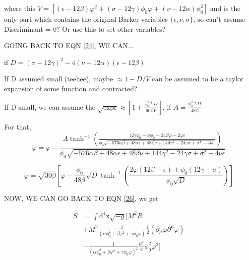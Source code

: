 \documentclass{article}
\begin{document}
where this $V = [(\epsilon - 12\beta) \varphi^2 + (\sigma - 12\gamma) \phi_0 \varphi + (\nu - 12\alpha)\phi^2_0]$ and is the only part which contains the original Barker variables $\{\epsilon, \nu, \sigma \}$, so can't assume Discriminant = 0? Or use this to set other variables?

\newpage

GOING BACK TO EQN \ref{24}, WE CAN...

if $D = (\sigma -12 \gamma )^2-4 (\nu -12 \alpha ) (\epsilon -12 \beta )$

If D assumed small (teehee), maybe $\approx 1 - D/V$ can be assumed to be a taylor expansion of some function and contracted? 

If D small, we can assume the $\sqrt{\text{expr}} \approx \left[ 1 + \frac{\phi_0^2*D}{96\beta V}  \right]$, if $A = \frac{\phi_0^2*D}{48\beta}$

For that,
\begin{equation}
    \tilde{\varphi} = \varphi-\frac{ A \tanh ^{-1}\left(\frac{12 \gamma  \phi_0 -\sigma  \phi_0 +24 \beta  \varphi-2 \varphi \epsilon }{\phi_0  \sqrt{-576 \alpha  \beta +48 \alpha  \epsilon +48 \beta  \nu +144 \gamma ^2-24 \gamma  \sigma +\sigma ^2-4 \nu  \epsilon }}\right)}{\phi_0  \sqrt{-576 \alpha  \beta +48 \alpha  \epsilon +48 \beta  \nu +144 \gamma ^2-24 \gamma  \sigma +\sigma ^2-4 \nu  \epsilon }}
\end{equation}


\begin{equation}
    \tilde{\varphi} = \sqrt{30\beta} \left[ \varphi - \frac{\phi_0}{48\beta}\sqrt{D} \tanh^{-1} \left( \frac{2\varphi (12\beta - \epsilon) + \phi_0 (12\gamma - \sigma)}{\phi_0 \sqrt{D}}\right) \right]
\end{equation}

NOW, WE CAN GO BACK TO EQN \ref{26}, we get

\begin{equation} \label{26}
    \begin{aligned}
        S &= \int \text{d}^4\text{x} \sqrt{-g} [ M^2 R \\
        &+ M^2 \frac{1}{(\alpha \phi^2_0 + \beta \varphi^2 + \gamma \phi_0 \varphi)} \frac{1}{2} (\partial_\mu  \tilde{\varphi} \partial^\mu \tilde{\varphi})  \\
        &-  \frac{1}{(\alpha \phi^2_0 + \beta \varphi^2 + \gamma \phi_0 \varphi)^2} \frac{\mu^2}{2} \phi^2_0 \varphi^2 ] 
    \end{aligned}
\end{equation}



\newpage

\printbibliography
\end{document}
